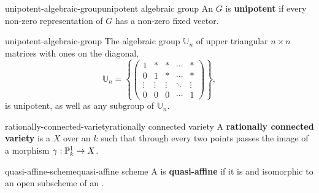 \begin{topic}{unipotent-algebraic-group}{unipotent algebraic group}
    An  $G$ is \textbf{unipotent} if every non-zero representation of $G$ has a non-zero fixed vector.
\end{topic}

\begin{example}{unipotent-algebraic-group}
    The algebraic group $\mathbb{U}_n$ of upper triangular $n \times n$ matrices with ones on the diagonal,
    \[ \mathbb{U}_n = \left\{ \begin{pmatrix} 1 & * & * & \cdots & * \\ 0 & 1 & * & \cdots & * \\ \vdots & \vdots & \vdots & \ddots & \vdots \\ 0 & 0 & 0 & \cdots & 1 \end{pmatrix} \right\} , \]
    is unipotent, as well as any subgroup of $\mathbb{U}_n$.
\end{example}

\begin{topic}{rationally-connected-variety}{rationally connected variety}
    A \textbf{rationally connected variety} is a  $X$ over an  $k$ such that through every two points passes the image of a morphism $\gamma : \mathbb{P}^1_k \to X$.
\end{topic}

\begin{topic}{quasi-affine-scheme}{quasi-affine scheme}
    A  is \textbf{quasi-affine} if it is  and isomorphic to an open subscheme of an .
\end{topic}

